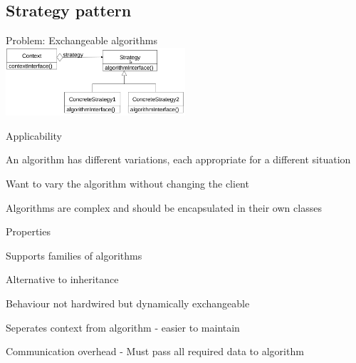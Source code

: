 \subsection{Strategy pattern}
\enumstart
	\item Problem: Exchangeable algorithms
	\\ \includegraphics[width=0.5\textwidth]{img/strategy_pattern.png}
	\item Applicability
	\enumstart
		\item An algorithm has different variations, each appropriate for a different situation
		\item Want to vary the algorithm without changing the client
		\item Algorithms are complex and should be encapsulated in their own classes
	\enumend
	\item Properties
	\enumstart
		\item Supports families of algorithms
		\item Alternative to inheritance
		\enumstart
			\item Behaviour not hardwired but dynamically exchangeable
			\item Seperates context from algorithm - easier to maintain
		\enumend
		\item Communication overhead - Must pass all required data to algorithm
	\enumend
\enumend

